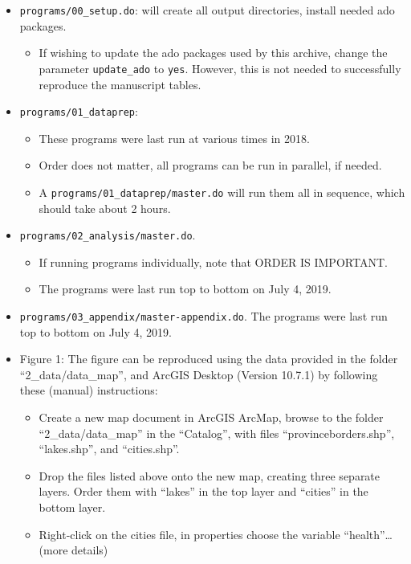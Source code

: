\documentclass[
]{article}
\providecommand{\tightlist}{%
  \setlength{\itemsep}{0pt}\setlength{\parskip}{0pt}}
\begin{document}
\begin{itemize}
\tightlist
\item
  \texttt{programs/00\_setup.do}: will create all output directories,
  install needed ado packages.

  \begin{itemize}
  \tightlist
  \item
    If wishing to update the ado packages used by this archive, change
    the parameter \texttt{update\_ado} to \texttt{yes}. However, this is
    not needed to successfully reproduce the manuscript tables.
  \end{itemize}
\item
  \texttt{programs/01\_dataprep}:

  \begin{itemize}
  \tightlist
  \item
    These programs were last run at various times in 2018.
  \item
    Order does not matter, all programs can be run in parallel, if
    needed.
  \item
    A \texttt{programs/01\_dataprep/master.do} will run them all in
    sequence, which should take about 2 hours.
  \end{itemize}
\item
  \texttt{programs/02\_analysis/master.do}.

  \begin{itemize}
  \tightlist
  \item
    If running programs individually, note that ORDER IS IMPORTANT.
  \item
    The programs were last run top to bottom on July 4, 2019.
  \end{itemize}
\item
  \texttt{programs/03\_appendix/master-appendix.do}. The programs were
  last run top to bottom on July 4, 2019.
\item
  Figure 1: The figure can be reproduced using the data provided in the
  folder ``2\_data/data\_map'', and ArcGIS Desktop (Version 10.7.1) by
  following these (manual) instructions:

  \begin{itemize}
  \tightlist
  \item
    Create a new map document in ArcGIS ArcMap, browse to the folder
    ``2\_data/data\_map'' in the ``Catalog'', with files
    ``provinceborders.shp'', ``lakes.shp'', and ``cities.shp''.
  \item
    Drop the files listed above onto the new map, creating three
    separate layers. Order them with ``lakes'' in the top layer and
    ``cities'' in the bottom layer.
  \item
    Right-click on the cities file, in properties choose the variable
    ``health''\ldots{} (more details)
  \end{itemize}
\end{itemize}
\end{document}

